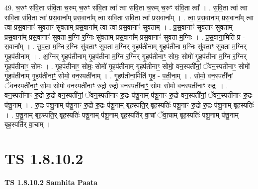 \documentclass[17pt]{extarticle}
\begin{document}
49. च॒रुꣳ स॑वि॒ता स॑वि॒ता च॒रुम् च॒रुꣳ स॑वि॒ता त्वा᳚ त्वा सवि॒ता च॒रुम् च॒रुꣳ स॑वि॒ता त्वा᳚ । . स॒वि॒ता त्वा᳚ त्वा सवि॒ता स॑वि॒ता त्वा᳚ प्रस॒वाना᳚म् प्रस॒वाना᳚म् त्वा सवि॒ता स॑वि॒ता त्वा᳚ प्रस॒वाना᳚म् । . त्वा॒ प्र॒स॒वाना᳚म् प्रस॒वाना᳚म् त्वा त्वा प्रस॒वानाꣳ॑ सुवताꣳ सुवताम् प्रस॒वाना᳚म् त्वा त्वा प्रस॒वानाꣳ॑ सुवताम् । . प्र॒स॒वानाꣳ॑ सुवताꣳ सुवताम् प्रस॒वाना᳚म् प्रस॒वानाꣳ॑ सुवता म॒ग्नि र॒ग्निः सु॑वताम् प्रस॒वाना᳚म् प्रस॒वानाꣳ॑ सुवता म॒ग्निः । . प्र॒स॒वाना॒मिति॑ प्र - स॒वाना᳚म् । . सु॒व॒ता॒ म॒ग्नि र॒ग्निः सु॑वताꣳ सुवता म॒ग्निर् गृ॒हप॑तीनाम् गृ॒हप॑तीना म॒ग्निः सु॑वताꣳ सुवता म॒ग्निर् गृ॒हप॑तीनाम् । . अ॒ग्निर् गृ॒हप॑तीनाम् गृ॒हप॑तीना म॒ग्नि र॒ग्निर् गृ॒हप॑तीनाꣳ॒॒ सोमः॒ सोमो॑ गृ॒हप॑तीना म॒ग्नि र॒ग्निर् गृ॒हप॑तीनाꣳ॒॒ सोमः॑ । . गृ॒हप॑तीनाꣳ॒॒ सोमः॒ सोमो॑ गृ॒हप॑तीनाम् गृ॒हप॑तीनाꣳ॒॒ सोमो॒ वन॒स्पती॑नां॒ ॅवन॒स्पती॑नाꣳ॒॒ सोमो॑ गृ॒हप॑तीनाम् गृ॒हप॑तीनाꣳ॒॒ सोमो॒ वन॒स्पती॑नाम् । . गृ॒हप॑तीना॒मिति॑ गृ॒ह - प॒ती॒ना॒म् । . सोमो॒ वन॒स्पती॑नां॒ ॅवन॒स्पती॑नाꣳ॒॒ सोमः॒ सोमो॒ वन॒स्पती॑नाꣳ रु॒द्रो रु॒द्रो वन॒स्पती॑नाꣳ॒॒ सोमः॒ सोमो॒ वन॒स्पती॑नाꣳ रु॒द्रः । . वन॒स्पती॑नाꣳ रु॒द्रो रु॒द्रो वन॒स्पती॑नां॒ ॅवन॒स्पती॑नाꣳ रु॒द्रः प॑शू॒नाम् प॑शू॒नाꣳ रु॒द्रो वन॒स्पती॑नां॒ ॅवन॒स्पती॑नाꣳ रु॒द्रः प॑शू॒नाम् । . रु॒द्रः प॑शू॒नाम् प॑शू॒नाꣳ रु॒द्रो रु॒द्रः प॑शू॒नाम् बृह॒स्पति॒र् बृह॒स्पतिः॑ पशू॒नाꣳ रु॒द्रो रु॒द्रः प॑शू॒नाम् बृह॒स्पतिः॑ । . प॒शू॒नाम् बृह॒स्पति॒र् बृह॒स्पतिः॑ पशू॒नाम् प॑शू॒नाम् बृह॒स्पति॑र् वा॒चां ॅवा॒चाम् बृह॒स्पतिः॑ पशू॒नाम् प॑शू॒नाम् बृह॒स्पति॑र् वा॒चाम् । \newline
\pagebreak
{}
\section*{ TS 1.8.10.2 }

\textbf{TS 1.8.10.2 } \newline
\textbf{Samhita Paata} \newline
\end{document}
